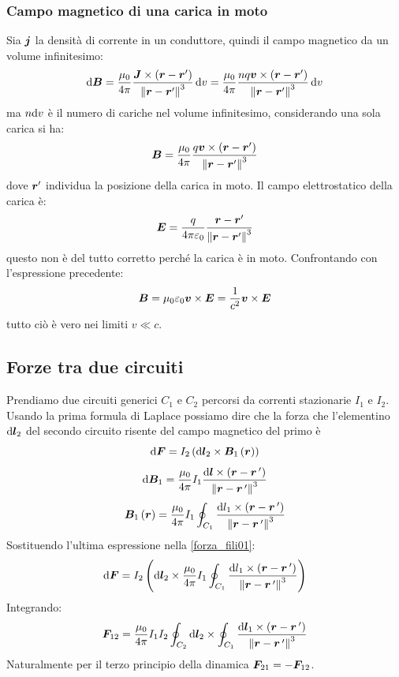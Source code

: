 \subsubsection{Campo magnetico di una carica in moto}
Sia $\boldsymbol{j}$ la densità di corrente in un conduttore, quindi il campo magnetico da un volume infinitesimo:
\[
  \mathrm{d}\boldsymbol{B} = \frac{\mu_0}{4\pi} \frac{\boldsymbol{J}\times (\boldsymbol{r}-\boldsymbol{r}')}{\left\lVert\boldsymbol{r}-\boldsymbol{r}'\right\rVert^3}\,\mathrm{d} v = \frac{\mu_0}{4\pi} \frac{nq\boldsymbol{v}\times (\boldsymbol{r}-\boldsymbol{r}')}{\left\lVert\boldsymbol{r}-\boldsymbol{r}'\right\rVert^3}\,\mathrm{d} v
\]
ma $n\mathrm{d} v$ è il numero di cariche nel volume infinitesimo, considerando una sola carica si ha:
\begin{equation}
  \boldsymbol{B} = \frac{\mu_0}{4\pi} \frac{q\boldsymbol{v}\times (\boldsymbol{r}-\boldsymbol{r}')}{\left\lVert\boldsymbol{r}-\boldsymbol{r}'\right\rVert^3}
\end{equation}
dove $\boldsymbol{r}'$ individua la posizione della carica in moto. Il campo elettrostatico della carica è:
\[
  \boldsymbol{E} = \frac{q}{4\pi\varepsilon_0}\frac{\boldsymbol{r}-\boldsymbol{r}'}{\left\lVert\boldsymbol{r}- \boldsymbol{r}'\right\rVert^3}
\]
questo non è del tutto corretto perché la carica è in moto. Confrontando con l'espressione precedente:
\begin{equation}
  \boldsymbol{B} = \mu_0\varepsilon_0\boldsymbol{v}\times \boldsymbol{E} = \frac{1}{c^2}\boldsymbol{v}\times \boldsymbol{E}
\end{equation}
tutto ciò è vero nei limiti $v\ll c$.

\subsection{Forze tra due circuiti}
Prendiamo due circuiti generici $C_1$ e $C_2$ percorsi da correnti stazionarie $I_1$ e $I_2$. Usando la prima formula di Laplace possiamo dire che la forza che l'elementino $\mathrm{d}\boldsymbol{l}_2$ del secondo circuito risente del campo magnetico del primo è
\begin{equation}
  \label{forza_fili01}
  \mathrm{d}\boldsymbol{F}=I_2\left(\mathrm{d}\boldsymbol{l}_2\times\boldsymbol{B}_1\left(\boldsymbol{r}\right)\right)
\end{equation}
\begin{equation}
  \mathrm{d} \boldsymbol{B}_1=\frac{\mu_0}{4\pi}I_1\frac{\mathrm{d}\boldsymbol{l}\times\left(\boldsymbol{r}-\boldsymbol{r}\,'\right)}{\left\lVert\boldsymbol{r}-\boldsymbol{r}\,'\right\rVert^3}
\end{equation}
\begin{equation}
  \boldsymbol{B}_1\left(\boldsymbol{r}\right)=\frac{\mu_0}{4\pi}I_1\oint_{C_1}\frac{\mathrm{d} l_1\times\left(\boldsymbol{r}-\boldsymbol{r}\,'\right)}{\left\lVert\boldsymbol{r}-\boldsymbol{r}\,'\right\rVert^3}
\end{equation}
Sostituendo l'ultima espressione nella \eqref{forza_fili01}:
\begin{equation}
  \mathrm{d} \boldsymbol{F}=I_2\left(\mathrm{d}\boldsymbol{l}_2\times\frac{\mu_0}{4\pi}I_1\oint_{C_1}\frac{\mathrm{d} l_1\times\left(\boldsymbol{r}-\boldsymbol{r}\,'\right)}{\left\lVert\boldsymbol{r}-\boldsymbol{r}\,'\right\rVert^3}\right)
\end{equation}
Integrando:
\begin{equation}
  \boldsymbol{F}_{12}=\frac{\mu_0}{4\pi}I_1I_2\oint_{C_2}\mathrm{d} \boldsymbol{l}_2\times\oint_{C_1}\frac{\mathrm{d} \boldsymbol{l}_1\times\left(\boldsymbol{r}-\boldsymbol{r}\,'\right)}{\left\lVert\boldsymbol{r}-\boldsymbol{r}\,'\right\rVert^3}
\end{equation}
Naturalmente per il terzo principio della dinamica $\boldsymbol{F}_{21}=-\boldsymbol{F}_{12}$.
